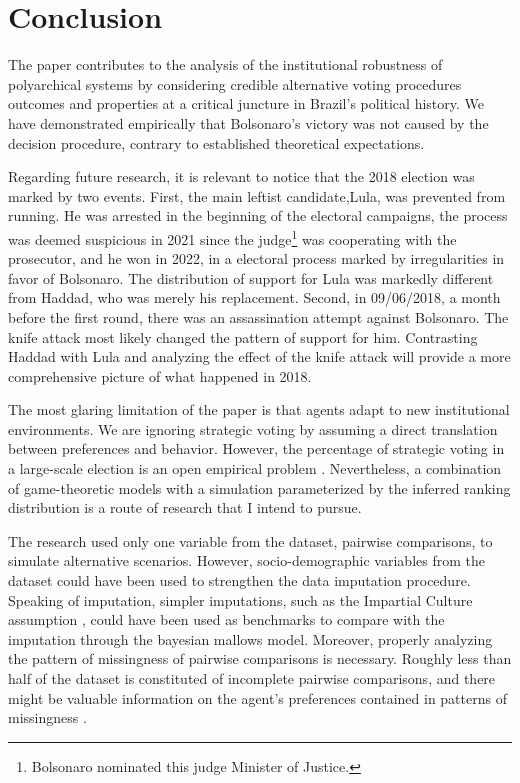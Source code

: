 \documentclass[hidelinks,11pt]{article}
\begin{document}
\section{Conclusion}

The paper contributes to the analysis of the institutional robustness of
polyarchical systems by considering credible alternative voting procedures
outcomes and properties at a critical juncture in Brazil's political history. We have demonstrated empirically that Bolsonaro's victory was not caused by the decision procedure, contrary to established theoretical expectations.

Regarding future research, it is relevant to notice that the 2018 election was marked by two events. First, the main leftist candidate,Lula, was prevented from running. He was arrested in the beginning of the electoral campaigns, the process was deemed suspicious in 2021 since the judge\footnote{Bolsonaro nominated this judge Minister of Justice.} was cooperating with the prosecutor, and he won in 2022, in a electoral process marked by irregularities in favor of Bolsonaro. The distribution of support for Lula was markedly different from Haddad, who was merely his replacement. Second, in 09/06/2018, a month before the first round, there was an assassination attempt against Bolsonaro. The knife attack most likely changed the pattern of support for him. Contrasting Haddad with Lula and analyzing the effect of the knife attack will provide a more comprehensive picture of what happened in 2018.


The most glaring limitation of the paper is that agents adapt to new
institutional environments. We are ignoring strategic voting by assuming a direct
translation between preferences and behavior.
However, the percentage of strategic voting in a large-scale election is an
open empirical problem \parencite{straeten10_strat_sincer_heuris_votin_under,kawai2013inferring}. Nevertheless, a
combination of game-theoretic models with a simulation parameterized by the
inferred ranking distribution is a route of research that I intend to pursue.

The research used only one variable from the dataset, pairwise
comparisons, to simulate alternative scenarios. However, socio-demographic
variables from the dataset could have been used to strengthen the data
imputation procedure. Speaking of imputation, simpler imputations, such as the
Impartial Culture assumption \parencite{regenwetter2006behavioral}, could have been
used as benchmarks to compare with the imputation through the bayesian mallows
model. Moreover, properly analyzing the pattern of missingness
of pairwise comparisons is necessary. Roughly less than half of the dataset is constituted of
incomplete pairwise comparisons, and there might be valuable information on the
agent's preferences contained in patterns of missingness
\parencite{mcelreath2020statistical}.
\end{document}
